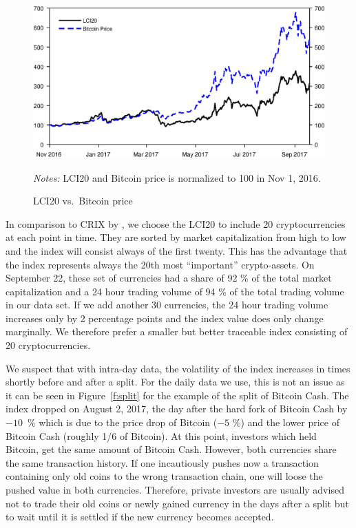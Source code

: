 \documentclass[11pt]{article}
\newcommand\fnotes[1]{\captionsetup{font=scriptsize}\caption*{\textsl{Notes:} #1}}
\begin{document}
 \begin{figure}[ht]%
     \centering%
     \caption{LCI20 vs.\ Bitcoin price}\label{f:lci20vsBTC}%
     \includegraphics[width=.8\textwidth]{figs/lci20_vs_btc.eps}%
     \smallskip\newline%
     \fnotes{LCI20 and Bitcoin price is normalized to 100 in Nov 1, 2016.}
 \end{figure}

In comparison to CRIX by \cite{Trimborn2016}, we choose the LCI20 to include 20 cryptocurrencies at each point in time.
They are sorted by market capitalization from high to low and the index will consist always of the first twenty.
This has the advantage that the index represents always the 20th most ``important'' crypto-assets.
On September 22, these set of currencies had a share of 92 \% of the total market capitalization and a 24 hour trading volume of 94 \% of the total trading volume in our data set.
If we add another 30 currencies, the 24 hour trading volume increases only by 2 percentage points and the index value does only change marginally.
We therefore prefer a smaller but better traceable index consisting of 20 cryptocurrencies.

We suspect that with intra-day data, the volatility of the index increases in times shortly before and after a split.
For the daily data we use, this is not an issue as it can be seen in Figure~\ref{f:split} for the example of the split of Bitcoin Cash.
The index dropped on August 2, 2017, the day after the hard fork of Bitcoin Cash by $-10$~\% which is due to the price drop of Bitcoin ($-5$ \%) and the lower price of Bitcoin Cash (roughly 1/6 of Bitcoin).
At this point, investors which held Bitcoin, get the same amount of Bitcoin Cash.
However, both currencies share the same transaction history.
If one incautiously pushes now a transaction containing only old coins to the wrong transaction chain, one will loose the pushed value in both currencies.
Therefore, private investors are usually advised not to trade their old coins or newly gained currency in the days after a split but to wait until it is settled if the new currency becomes accepted.
\end{document}
